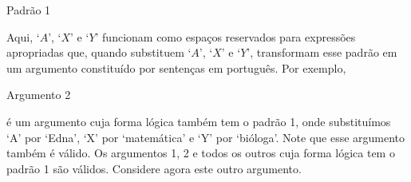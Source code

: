 \begin{description}
\item[Padrão 1]
\end{description}
Aqui, `$A$', `$X$' e `$Y$' funcionam como espaços reservados para expressões apropriadas que, quando substituem `$A$', `$X$' e `$Y$', transformam esse padrão em um argumento constituído por sentenças em português.
Por exemplo,
\begin{description}
\item[Argumento 2]
\end{description}
é um argumento cuja forma lógica também tem o padrão 1, onde substituímos `A' por `Edna', `X' por `matemática' e `Y' por `bióloga'.
Note que esse argumento também é válido.
Os argumentos 1, 2 e todos os outros cuja forma lógica tem o padrão 1 são válidos.
Considere agora este outro argumento.


